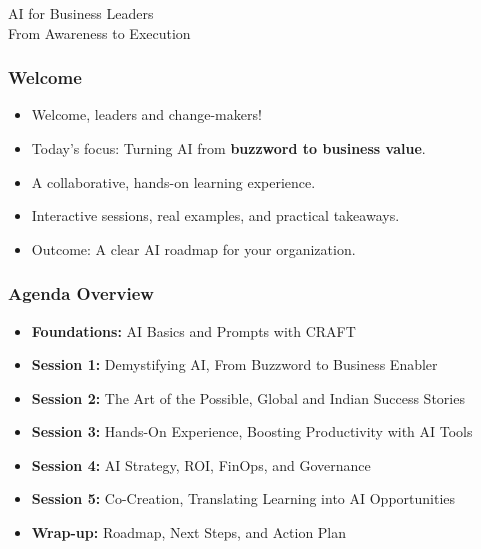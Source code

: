 \begin{frame}[fragile]\frametitle{}
\begin{center}
{\Large AI for Business Leaders}\\[0.5em]
{\large From Awareness to Execution}
\end{center}
\end{frame}

\begin{frame}[fragile]\frametitle{Welcome}

\begin{itemize}
  \item Welcome, leaders and change-makers!
  \item Today's focus: Turning AI from \textbf{buzzword to business value}.
  \item A collaborative, hands-on learning experience.
  \item Interactive sessions, real examples, and practical takeaways.
  \item Outcome: A clear AI roadmap for your organization.
\end{itemize}

\end{frame}

\begin{frame}[fragile]\frametitle{Agenda Overview}

\begin{itemize}
  \item \textbf{Foundations:} AI Basics and Prompts with CRAFT
  \item \textbf{Session 1:} Demystifying AI, From Buzzword to Business Enabler
  \item \textbf{Session 2:} The Art of the Possible, Global and Indian Success Stories
  \item \textbf{Session 3:} Hands-On Experience, Boosting Productivity with AI Tools
  \item \textbf{Session 4:} AI Strategy, ROI, FinOps, and Governance
  \item \textbf{Session 5:} Co-Creation, Translating Learning into AI Opportunities
  \item \textbf{Wrap-up:} Roadmap, Next Steps, and Action Plan
\end{itemize}

\end{frame}

